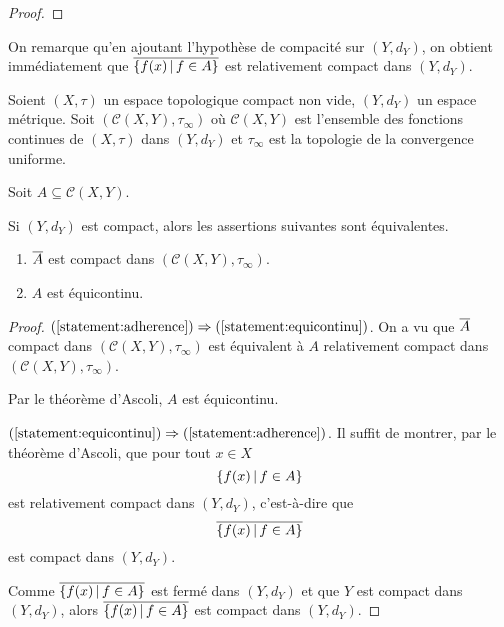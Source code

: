 \ifdefined\outputproof
\begin{proof}

\end{proof}
\fi

On remarque qu'en ajoutant l'hypothèse de compacité sur $(Y, d_{Y})$, on obtient
immédiatement que $\adh{\GSsetDef{f(x)}{f \in A}}$ est relativement compact dans
$(Y, d_{Y})$.

\begin{corollary}
	Soient $(X, \tau)$ un espace topologique compact non vide, $(Y, d_{Y})$ un
	espace métrique. Soit $(\mathcal{C}(X, Y), \tau_{\infty})$ où
	$\mathcal{C}(X, Y)$ est l'ensemble des fonctions continues de $(X, \tau)$
	dans $(Y, d_{Y})$ et $\tau_{\infty}$ est la topologie de la convergence uniforme.

	Soit $A \subseteq \mathcal{C}(X, Y)$.

	Si $(Y, d_{Y})$ est compact, alors les assertions suivantes sont
	équivalentes.

	\begin{enumerate}
		\item \label{statement:adherence} $\adh{A}$ est compact dans $(\mathcal{C}(X, Y), \tau_{\infty})$.
		\item \label{statement:equicontinu} $A$ est équicontinu.
	\end{enumerate}
\end{corollary}

\ifdefined\outputproof
\begin{proof}
	$(\ref{statement:adherence}) \implies (\ref{statement:equicontinu})$.
	On a vu que $\adh{A}$ compact dans $(\mathcal{C}(X, Y), \tau_{\infty})$
	est équivalent à $A$ relativement compact dans $(\mathcal{C}(X, Y),
	\tau_{\infty})$.

	Par le théorème d'Ascoli, $A$ est équicontinu.

	$(\ref{statement:equicontinu}) \implies (\ref{statement:adherence})$.
	Il suffit de montrer, par le théorème d'Ascoli, que pour tout $x \in X$
	\begin{equation}
		\GSsetDef{f(x)}{f \in A}
	\end{equation}
	est relativement compact dans $(Y, d_{Y})$,
	c'est-à-dire que
	\begin{equation}
		\adh{\GSsetDef{f(x)}{f \in A}}
	\end{equation}
	est compact dans $(Y, d_{Y})$.

	Comme $\adh{\GSsetDef{f(x)}{f \in A}}$ est fermé dans $(Y, d_{Y})$ et que
	$Y$ est compact dans $(Y, d_{Y})$, alors $\adh{\GSsetDef{f(x)}{f \in A}}$ est
	compact dans $(Y, d_{Y})$.
\end{proof}
\fi

